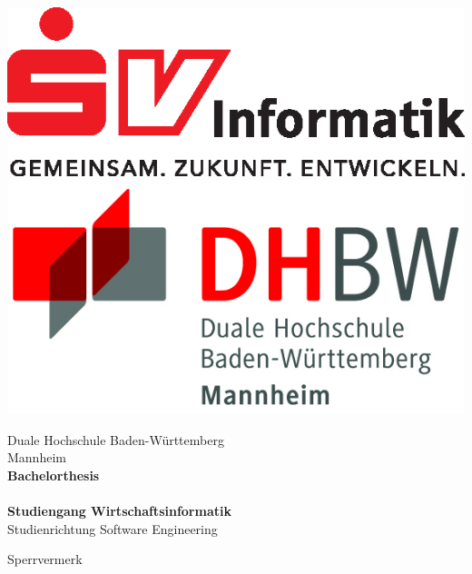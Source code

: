\begin{titlepage}
\begin{minipage}{\textwidth}
		\vspace{-2cm}
		\noindent \includegraphics[scale=0.67]{img/logoeps/SVI-logo-claim.eps} \hfill   \includegraphics[scale=0.79]{img/logo.jpg}
\end{minipage}
\vspace{1em}
\sffamily
\begin{center}
	\textsf{\large{}Duale Hochschule Baden-W\"urttemberg\\[1.5mm] Mannheim}\\[2em]
	\textsf{\textbf{\Large{}Bachelorthesis}}\\[3mm]
	\textsf{\textbf{\DerTitelDerArbeit}} \\[1.5cm]
	\textsf{\textbf{\Large{}Studiengang Wirtschaftsinformatik}\\[3mm] \textsf{Studienrichtung Software Engineering}}
	
	\vspace{3em}
	\textsf{\Large{Sperrvermerk}}
\vfill

\begin{minipage}{\textwidth}


\end{minipage}
\end{center}
\end{titlepage}
